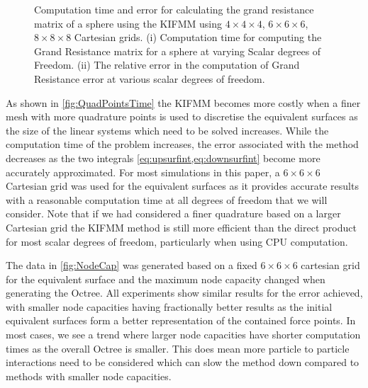 \begin{figure}[ht]
\begin{subfigure}[b]{0.49\textwidth}
         \caption{\label{fig:QuadPointsError}}
     \end{subfigure}
        \caption[Computation time and error for calculating the grand resistance matrix of a sphere using the KIFMM using $4\times4\times4$, $6\times6\times6$, $8\times8\times8$ Cartesian grids.]{Computation time and error for calculating the grand resistance matrix of a sphere using the KIFMM using $4\times4\times4$, $6\times6\times6$, $8\times8\times8$ Cartesian grids. (i) Computation time for computing the Grand Resistance matrix for a sphere at varying Scalar degrees of Freedom. (ii) The relative error in the computation of Grand Resistance error at various scalar degrees of freedom.}
        \label{fig:QuadPoints}
\end{figure}

As shown in \cref{fig:QuadPointsTime} the KIFMM becomes more costly when a finer mesh with more quadrature points is used to discretise the equivalent surfaces as the size of the linear systems which need to be solved increases. While the computation time of the problem increases, the error associated with the method decreases as the two integrals \cref{eq:upsurfint,eq:downsurfint} become more accurately approximated. For most simulations in this paper, a $6 \times 6 \times 6$ Cartesian grid was used for the equivalent surfaces as it provides accurate results with a reasonable computation time at all degrees of freedom that we will consider. Note that if we had considered a finer quadrature based on a larger Cartesian grid the KIFMM method is still more efficient than the direct product for most scalar degrees of freedom, particularly when using CPU computation. 

The data in \cref{fig:NodeCap} was generated based on a fixed $6\times6\times6$ cartesian grid for the equivalent surface and the maximum node capacity changed when generating the Octree. All experiments show similar results for the error achieved, with smaller node capacities having fractionally better results as the initial equivalent surfaces form a better representation of the contained force points. In most cases, we see a trend where larger node capacities have shorter computation times as the overall Octree is smaller. This does mean more particle to particle interactions need to be considered which can slow the method down compared to methods with smaller node capacities. 

